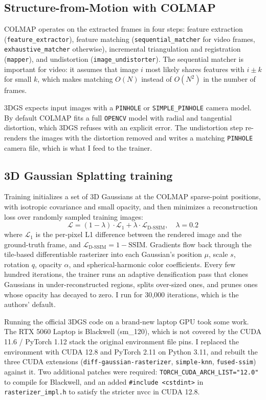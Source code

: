 \documentclass[conference]{IEEEtran}
\begin{document}
\subsection{Structure-from-Motion with COLMAP}

COLMAP operates on the extracted frames in four steps: feature extraction (\texttt{feature\_extractor}), feature matching (\texttt{sequential\_matcher} for video frames, \texttt{exhaustive\_matcher} otherwise), incremental triangulation and registration (\texttt{mapper}), and undistortion (\texttt{image\_undistorter}). The sequential matcher is important for video: it assumes that image $i$ most likely shares features with $i \pm k$ for small $k$, which makes matching $O(N)$ instead of $O(N^2)$ in the number of frames.

3DGS expects input images with a \texttt{PINHOLE} or \texttt{SIMPLE\_PINHOLE} camera model. By default COLMAP fits a full \texttt{OPENCV} model with radial and tangential distortion, which 3DGS refuses with an explicit error. The undistortion step re-renders the images with the distortion removed and writes a matching \texttt{PINHOLE} camera file, which is what I feed to the trainer.

\subsection{3D Gaussian Splatting training}

Training initializes a set of 3D Gaussians at the COLMAP sparse-point positions, with isotropic covariance and small opacity, and then minimizes a reconstruction loss over randomly sampled training images:
\begin{equation}
\mathcal{L} = (1 - \lambda) \cdot \mathcal{L}_1 + \lambda \cdot \mathcal{L}_{\text{D-SSIM}}, \quad \lambda = 0.2
\end{equation}
where $\mathcal{L}_1$ is the per-pixel L1 difference between the rendered image and the ground-truth frame, and $\mathcal{L}_{\text{D-SSIM}} = 1 - \text{SSIM}$. Gradients flow back through the tile-based differentiable rasterizer into each Gaussian's position $\mu$, scale $s$, rotation $q$, opacity $\alpha$, and spherical-harmonic color coefficients. Every few hundred iterations, the trainer runs an adaptive densification pass that clones Gaussians in under-reconstructed regions, splits over-sized ones, and prunes ones whose opacity has decayed to zero. I run for 30{,}000 iterations, which is the authors' default.

Running the official 3DGS code on a brand-new laptop GPU took some work. The RTX 5060 Laptop is Blackwell (sm\_120), which is not covered by the CUDA 11.6 / PyTorch 1.12 stack the original environment file pins. I replaced the environment with CUDA 12.8 and PyTorch 2.11 on Python 3.11, and rebuilt the three CUDA extensions (\texttt{diff-gaussian-rasterizer}, \texttt{simple-knn}, \texttt{fused-ssim}) against it. Two additional patches were required: \texttt{TORCH\_CUDA\_ARCH\_LIST="12.0"} to compile for Blackwell, and an added \texttt{\#include <cstdint>} in \texttt{rasterizer\_impl.h} to satisfy the stricter nvcc in CUDA 12.8.
\end{document}
